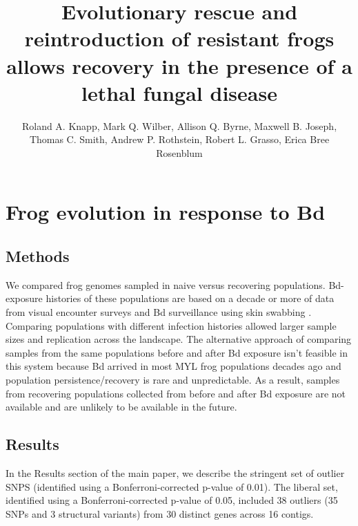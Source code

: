 \documentclass[9pt,twoside,lineno]{pnas-new}
\title{Evolutionary rescue and reintroduction of resistant frogs allows recovery in the presence of a lethal fungal disease}
\author{Roland A. Knapp, Mark Q. Wilber, Allison Q. Byrne, Maxwell B. Joseph, Thomas C. Smith, Andrew P. Rothstein, Robert L. Grasso, Erica Bree Rosenblum}
\begin{document}
\maketitle

\SItext
\hypertarget{frog-evolution-in-response-to-bd-2}{%
\section{Frog evolution in response to
Bd}\label{frog-evolution-in-response-to-bd-2}}

\hypertarget{methods}{%
\subsection{Methods}\label{methods}}

We compared frog genomes sampled in naive versus recovering populations.
Bd-exposure histories of these populations are based on a decade or more
of data from visual encounter surveys and Bd surveillance using skin
swabbing \citep[e.g.,][]{knapp2016}. Comparing populations with
different infection histories allowed larger sample sizes and
replication across the landscape. The alternative approach of comparing
samples from the same populations before and after Bd exposure isn't
feasible in this system because Bd arrived in most MYL frog populations
decades ago and population persistence/recovery is rare and
unpredictable. As a result, samples from recovering populations
collected from before and after Bd exposure are not available and are
unlikely to be available in the future.

\hypertarget{results-1}{%
\subsection{Results}\label{results-1}}

In the Results section of the main paper, we describe the stringent set
of outlier SNPS (identified using a Bonferroni-corrected p-value of
0.01). The liberal set, identified using a Bonferroni-corrected p-value
of 0.05, included 38 outliers (35 SNPs and 3 structural variants) from
30 distinct genes across 16 contigs.
\end{document}

